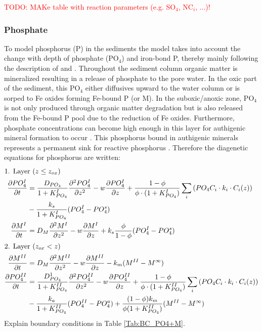\documentclass[gmd, manuscript]{copernicus}
\begin{document}
\textcolor{red}{TODO: MAKe table with reaction parameters (e.g. SO$_4$, NC$_i$, ...)!}
\subsubsection{Phosphate}
To model phosphorus (P) in the sediments the model takes into account the change with depth of phosphate (PO$_4$) and iron-bond P, thereby mainly following the description of \citet{caroline_p_slomp_key_1996} 
and \citet{gypens_simple_2008}. Throughout the sediment column organic matter is mineralized resulting in a release of phosphate to the pore water. In the oxic part of the sediment, this PO$_4$ either 
diffusives upward to the water column or is sorped to Fe oxides forming Fe-bound P (or M)\citep{slomp1998role}. In the suboxic/anoxic zone, PO$_4$ is not only produced through organic matter degradation but is 
also released from the Fe-bound P pool due to the reduction of Fe oxides. Furthermore, phosphate concentrations can become high enough in this layer for authigenic mineral formation to occur \citep{cappellen_mathematical_1988}. 
This phosphorus bound in authigenic minerals represents a permanent sink for reactive phosphorus \citep{caroline_p_slomp_key_1996}. 
Therefore the diagenetic equations for phosphorus are written:
\begin{align}
\intertext{1. Layer ($z \leq z_{ox}$)}
 \frac{\partial PO_4^I}{\partial t} &= \frac{D_{PO_4}}{1+K_{PO_4}^I} \frac{\partial^2PO_4^I }{\partial z^2} - w\frac{\partial PO_4^I }{\partial z} + \frac{1-\phi}{\phi \cdot (1+K_{PO_4}^I)}\sum_i 
					\left( PO_4C_i \cdot k_i \cdot C_{i}(z) \right) \notag\\
					& - \frac{k_{s}}{1+K_{PO_4}^I}(PO_4^I-PO_4^s)\\  %
 \frac{\partial M^I}{\partial t} &= D_{M}\frac{\partial^2M^I }{\partial z^2} - w\frac{\partial M^I }{\partial z} + k_{s}\frac{\phi}{1-\phi}(PO_4^I-PO_4^s)\\  
 \intertext{2. Layer ($z_{ox} < z$)} 
 \frac{\partial M^{II}}{\partial t} & = D_{M}\frac{\partial^2M^{II} }{\partial z^2} - w\frac{\partial M^{II} }{\partial z} - k_{m}(M^{II} - M^\infty)\\  
 \frac{\partial PO_4^{II}}{\partial t} &= \frac{D_{PO_4}^1}{1+K_{PO_4}^{II}} \frac{\partial^2PO_4^{II} }{\partial z^2} - w\frac{\partial PO_4^{II} }{\partial z} + \frac{1-\phi}{\phi \cdot (1+K_{PO_4}^{II})}\sum_i 
					\left( PO_4C_i \cdot k_i \cdot C_{i}(z) \right) \notag\\
					& - \frac{k_{a}}{1+K_{PO_4}^{II}}(PO_4^{II}-PO_4^a) + \frac{(1-\phi)k_{m}}{\phi(1+K_{PO_4}^{II})}(M^{II}-M^\infty)\\
\end{align}
Explain boundary conditions in Table \ref{Tab:BC_PO4+M}.
\end{document}
